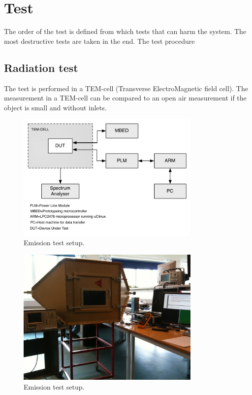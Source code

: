\chapter{Test}
The order of the test is defined from which tests that can harm the system. The most destructive tests are taken in the end. 
The test procedure 
\section{Radiation test}
The test is performed in a TEM-cell (Transverse ElectroMagnetic field cell).
The measurement in a TEM-cell can be compared to an open air measurement if the object is small and without inlets. 

\begin{figure}[H]
	\begin{centering}
		 \includegraphics[width=0.8\textwidth]{images/emission_setup.pdf}
		\caption{Emission test setup.}
	\end{centering}
\end{figure}

\begin{figure}[H]
	\begin{centering}
		 \includegraphics[width=0.8\textwidth]{images/tem_celle_radiation.jpg}
		\caption{Emission test setup.}
	\end{centering}
\end{figure}

